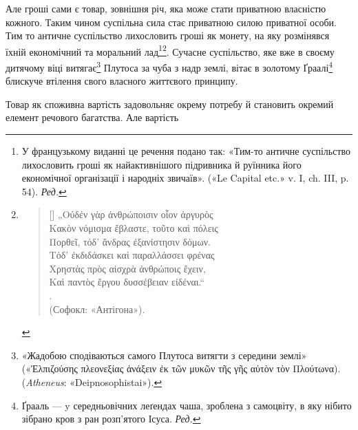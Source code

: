Але гроші сами є товар, зовнішня річ, яка може стати приватною
власністю кожного. Таким чином суспільна сила стає приватною
силою приватної особи. Тим то античне суспільство лихословить
гроші як монету, на яку розмінявся їхній економічний та моральний
лад\footnote*{
У французькому виданні це речення подано так: «Тим-то
античне суспільство лихословить гроші як найактивнішого підривника й руїнника
його економічної організації і народніх звичаїв». («Le Capital etc.» v. I,
ch. III, p. 54). \emph{Ред.}
}\footnote{
\settowidth{\versewidth}{В усякій справі путь показує безбожну].}
\begin{verse}[\versewidth]
\vspace{-\dimexpr\baselineskip+\topsep}
\textgreek{„Οὐδέν γὰρ ἀνθρώποισιν οἷον ἀργυρὸς \\
Κακὸν νόμισμα ἔβλαστε, τοῦτο καὶ πόλεις \\
Πορθεῖ, τόδ’ ἄνδρας ἐξανίστησιν δόμων. \\
Τόδ’ ἐκδιδάσκει καὶ παραλλάσσει φρένας \\
Χρηστὰς πρὸς αἰσχρὰ ἀνθρώποις ἔχειν, \\
Καὶ παντὸς ἔργου δυσσέβειαν εἰδέναι.“} \\
. \\
\smallskip
(Софокл: «Антігона»).
\end{verse}
}. Сучасне суспільство, яке вже в своєму дитячому
віці витягає\footnote{
«Жадобою сподіваються самого Плутоса витягти з середини землі»
(«\textgreek{Ἐλπιζούσης  πλεονεξίας ἀνάξειν ἐκ τῶν μυκῶν τῆς γῆς αὐτὸν τὸν Πλούτωνα}). (\emph{Atheneus}:
«Deipnosophistai»).
} Плутоса за чуба з надр землі, вітає в золотому
Ґраалі\footnote*{
Ґрааль — y середньовічних леґендах чаша, зроблена з самоцвіту,
в яку нібито зібрано кров з ран розп’ятого Ісуса. \emph{Ред.}
} блискуче втілення свого власного життєвого принципу.

Товар як споживна вартість задовольняє окрему потребу й
становить окремий елемент речового багатства. Але вартість
\parbreak{}  %
